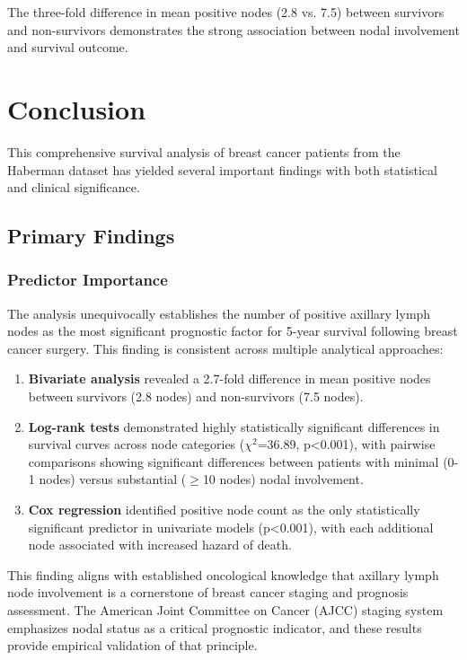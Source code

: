\documentclass[12pt,a4paper]{article}
\begin{document}
The three-fold difference in mean positive nodes (2.8 vs. 7.5) between survivors and non-survivors demonstrates the strong association between nodal involvement and survival outcome.

\section{Conclusion}

This comprehensive survival analysis of breast cancer patients from the Haberman dataset has yielded several important findings with both statistical and clinical significance.

\subsection{Primary Findings}

\subsubsection{Predictor Importance}

The analysis unequivocally establishes the number of positive axillary lymph nodes as the most significant prognostic factor for 5-year survival following breast cancer surgery. This finding is consistent across multiple analytical approaches:

\begin{enumerate}
    \item \textbf{Bivariate analysis} revealed a 2.7-fold difference in mean positive nodes between survivors (2.8 nodes) and non-survivors (7.5 nodes).
    
    \item \textbf{Log-rank tests} demonstrated highly statistically significant differences in survival curves across node categories ($\chi^2$=36.89, p<0.001), with pairwise comparisons showing significant differences between patients with minimal (0-1 nodes) versus substantial ($\geq$10 nodes) nodal involvement.
    
    \item \textbf{Cox regression} identified positive node count as the only statistically significant predictor in univariate models (p<0.001), with each additional node associated with increased hazard of death.
\end{enumerate}

This finding aligns with established oncological knowledge that axillary lymph node involvement is a cornerstone of breast cancer staging and prognosis assessment. The American Joint Committee on Cancer (AJCC) staging system emphasizes nodal status as a critical prognostic indicator, and these results provide empirical validation of that principle.
\end{document}

